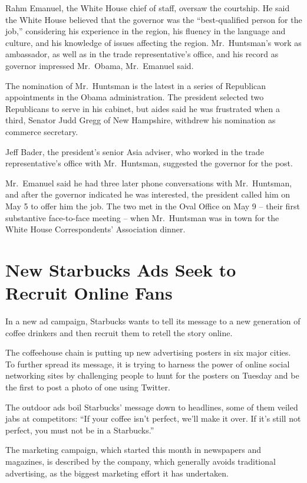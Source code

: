 \documentclass[12pt,a4paper,onecolumn]{article}
\begin{document}
Rahm Emanuel, the White House chief of staff, oversaw the courtship. He said the White House
believed that the governor was the ``best-qualified person for the job,'' considering his experience
in the region, his fluency in the language and culture, and his knowledge of issues affecting the
region. Mr.~Huntsman's work as ambassador, as well as in the trade representative's office, and his
record as governor impressed Mr.~Obama, Mr.~Emanuel said.

The nomination of Mr.~Huntsman is the latest in a series of Republican appointments in the Obama
administration. The president selected two Republicans to serve in his cabinet, but aides said he
was frustrated when a third, Senator Judd Gregg of New Hampshire, withdrew his nomination as
commerce secretary.

Jeff Bader, the president's senior Asia adviser, who worked in the trade representative's office
with Mr.~Huntsman, suggested the governor for the post.

Mr.~Emanuel said he had three later phone conversations with Mr.~Huntsman, and after the governor
indicated he was interested, the president called him on May 5 to offer him the job. The two met in
the Oval Office on May 9 -- their first substantive face-to-face meeting -- when Mr.~Huntsman was in
town for the White House Correspondents' Association dinner.

\section{New Starbucks Ads Seek to Recruit Online Fans}

In a new ad campaign, Starbucks wants to tell its message to a new generation of coffee drinkers and
then recruit them to retell the story online.

The coffeehouse chain is putting up new advertising posters in six major cities. To further spread
its message, it is trying to harness the power of online social networking sites by challenging
people to hunt for the posters on Tuesday and be the first to post a photo of one using Twitter.

The outdoor ads boil Starbucks' message down to headlines, some of them veiled jabs at competitors:
``If your coffee isn't perfect, we'll make it over. If it's still not perfect, you must not be in a
Starbucks.''

The marketing campaign, which started this month in newspapers and magazines, is described by the
company, which generally avoids traditional advertising, as the biggest marketing effort it has
undertaken.
\end{document}
